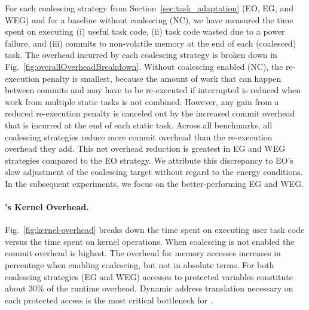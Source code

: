 For each coalescing strategy from Section~\ref{sec:task_adaptation} (EO, EG,
and WEG) and for a baseline without coalescing (NC), we have measured the time
spent on executing (i) useful task code, (ii) task code wasted due to a power failure, and
(iii) commits to non-volatile memory at the end of each (coalesced)
task.
%
The overhead incurred by each coalescing strategy is broken down in
Fig.~\ref{fig:overallOverheadBreakdown}. Without coalescing enabled (NC), the
re-execution penalty is smallest, because the amount of work that can happen
between commits and may have to be re-executed if interrupted is reduced when
work from multiple static tasks is not combined.
%
However, any gain from a reduced re-execution penalty is canceled out by
the increased commit overhead that is incurred at the end of each static
task.
%
Across all benchmarks, all coalescing strategies reduce more commit overhead
than the re-execution overhead they add.
%
This net overhead reduction is greatest in EG and WEG strategies compared
to the EO strategy. We attribute this discrepancy to EO's slow adjustment
of the coalescing target without regard to the energy conditions.
%
In the subsequent experiments, we focus on the better-performing EG and WEG.

\paragraph{\sys's Kernel Overhead.}
%
Fig.~\ref{fig:kernel-overhead} breaks down the time spent on executing 
user task code versus the time spent on kernel operations.
When coalescing is not enabled the commit overhead is highest.
%
The overhead for memory accesses increases in percentage when enabling coalescing,
but not in absolute terms.
%
For both coalescing strategies (EG and WEG) accesses to protected variables
constitute about 30\% of the runtime overhead. Dynamic address translation
necessary on each protected access is the most critical bottleneck for \sys.

